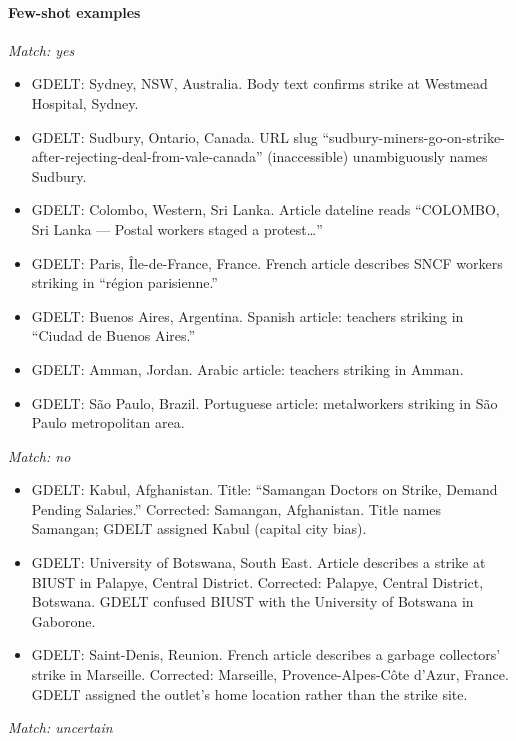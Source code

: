\documentclass[
  11pt,
]{article}
\providecommand{\tightlist}{%
  \setlength{\itemsep}{0pt}\setlength{\parskip}{0pt}}
\begin{document}
\paragraph{Few-shot examples}\label{few-shot-examples}

\emph{Match: yes}

\begin{itemize}
\tightlist
\item
  GDELT: Sydney, NSW, Australia. Body text confirms strike at Westmead
  Hospital, Sydney.
\item
  GDELT: Sudbury, Ontario, Canada. URL slug
  ``sudbury-miners-go-on-strike-after-rejecting-deal-from-vale-canada''
  (inaccessible) unambiguously names Sudbury.
\item
  GDELT: Colombo, Western, Sri Lanka. Article dateline reads ``COLOMBO,
  Sri Lanka --- Postal workers staged a protest\ldots{}''
\item
  GDELT: Paris, Île-de-France, France. French article describes SNCF
  workers striking in ``région parisienne.''
\item
  GDELT: Buenos Aires, Argentina. Spanish article: teachers striking in
  ``Ciudad de Buenos Aires.''
\item
  GDELT: Amman, Jordan. Arabic article: teachers striking in Amman.
\item
  GDELT: São Paulo, Brazil. Portuguese article: metalworkers striking in
  São Paulo metropolitan area.
\end{itemize}

\emph{Match: no}

\begin{itemize}
\tightlist
\item
  GDELT: Kabul, Afghanistan. Title: ``Samangan Doctors on Strike, Demand
  Pending Salaries.'' Corrected: Samangan, Afghanistan. Title names
  Samangan; GDELT assigned Kabul (capital city bias).
\item
  GDELT: University of Botswana, South East. Article describes a strike
  at BIUST in Palapye, Central District. Corrected: Palapye, Central
  District, Botswana. GDELT confused BIUST with the University of
  Botswana in Gaborone.
\item
  GDELT: Saint-Denis, Reunion. French article describes a garbage
  collectors' strike in Marseille. Corrected: Marseille,
  Provence-Alpes-Côte d'Azur, France. GDELT assigned the outlet's home
  location rather than the strike site.
\end{itemize}

\emph{Match: uncertain}
\end{document}
